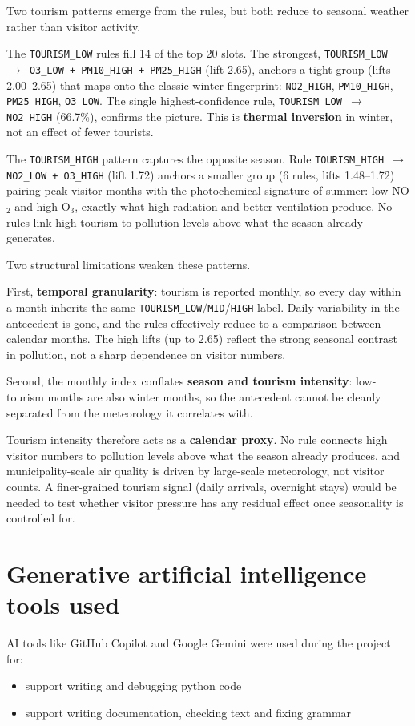 \documentclass{article}
\begin{document}
	Two tourism patterns emerge from the rules, but both reduce to seasonal weather rather than visitor activity.

	The \texttt{TOURISM\_LOW} rules fill 14 of the top 20 slots. The strongest, \texttt{TOURISM\_LOW $\rightarrow$ O3\_LOW + PM10\_HIGH + PM25\_HIGH} (lift 2.65), anchors a tight group (lifts 2.00--2.65) that maps onto the classic winter fingerprint: \texttt{NO2\_HIGH}, \texttt{PM10\_HIGH}, \texttt{PM25\_HIGH}, \texttt{O3\_LOW}. The single highest-confidence rule, \texttt{TOURISM\_LOW $\rightarrow$ NO2\_HIGH} (66.7\%), confirms the picture. This is \textbf{thermal inversion} in winter, not an effect of fewer tourists.

	The \texttt{TOURISM\_HIGH} pattern captures the opposite season. Rule \texttt{TOURISM\_HIGH $\rightarrow$ NO2\_LOW + O3\_HIGH} (lift 1.72) anchors a smaller group (6 rules, lifts 1.48--1.72) pairing peak visitor months with the photochemical signature of summer: low NO$_2$ and high O$_3$, exactly what high radiation and better ventilation produce. No rules link high tourism to pollution levels above what the season already generates.

	Two structural limitations weaken these patterns. 
	
	First, \textbf{temporal granularity}: tourism is reported monthly, so every day within a month inherits the same \texttt{TOURISM\_LOW}/\texttt{MID}/\texttt{HIGH} label. 
	Daily variability in the antecedent is gone, and the rules effectively reduce to a comparison between calendar months. 
	The high lifts (up to 2.65) reflect the strong seasonal contrast in pollution, not a sharp dependence on visitor numbers. 
	
	Second, the monthly index conflates \textbf{season and tourism intensity}: low-tourism months are also winter months, so the antecedent cannot be cleanly separated from the meteorology it correlates with.

	Tourism intensity therefore acts as a \textbf{calendar proxy}. 
	No rule connects high visitor numbers to pollution levels above what the season already produces, and municipality-scale air quality is driven by large-scale meteorology, not visitor counts. 
	A finer-grained tourism signal (daily arrivals, overnight stays) would be needed to test whether visitor pressure has any residual effect once seasonality is controlled for.
	\newpage
	
	\section{Generative artificial intelligence tools used}

	AI tools like GitHub Copilot and Google Gemini were used during the project for:
	\begin{itemize}
		\item support writing and debugging python code
		\item support writing documentation, checking text and fixing grammar
	\end{itemize}

	
\end{document}

